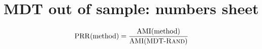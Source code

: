 \documentclass[9pt]{article}
\begin{document}
\section*{MDT out of sample: numbers sheet}
\begin{equation}\label{eq:prr}
\mathrm{PRR}(\mathrm{method})=\frac{\mathrm{AMI}(\mathrm{method})}{\mathrm{AMI}(\text{MDT-\textsc{Rand}})}
\end{equation}

\end{document}
